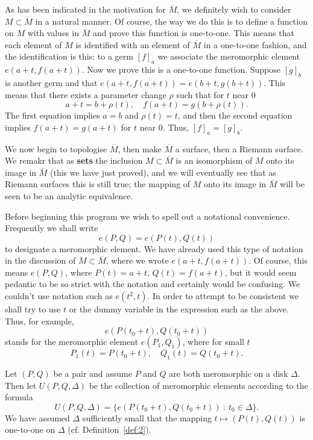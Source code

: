 \documentclass[a4paper,11pt]{article}
\begin{document}
As has been indicated in the motivation for $\overline{M}$, we
definitely wish to consider $M \subset \overline{M}$ in a natural
manner.  Of course, the way we do this is to define a function on $M$
with values in $\overline{M}$ and prove this function is one-to-one.
This means that each element of $M$ is identified with an element of
$\overline{M}$ in a one-to-one fashion, and the identification is
this: to a germ $[f]_a$ we associate the meromorphic element $e(a+t,
f(a+t))$.  Now we prove this is a one-to-one function.  Suppose
$[g]_b$ is another germ and that $e(a+t, f(a+t)) = e(b+t, g(b+t))$.
This means that there exists a parameter change $\rho$ such that
for $t$ near 0
$$
a + t = b + \rho(t),\quad
f(a+t) = g(b+\rho(t)).
$$
The first equation implies $a = b$ and $\rho(t) = t$, and then the
second equation implies $f(a+t) = g(a+t)$ for $t$ near 0.  Thus,
$[f]_a = [g]_b$.

We now begin to topologise $\overline{M}$, then make $\overline{M}$ a
surface, then a Riemann surface.  We remakr that as \textbf{sets} the
inclusion $M \subset \overline{M}$ is an isomorphism of $M$ onto its
image in $\overline{M}$ (this we have just proved), and we will
eventually see that as Riemann surfaces this is still true; the
mapping of $M$ onto its image in $\overline{M}$ will be seen to be an
analytic equivalence.

Before beginning this program we wish to spell out a notational
convenience.  Frequently we shall write
$$
e(P,Q) = e(P(t),Q(t))
$$
to designate a meromorphic element.  We have already used this type of
notation in the discussion of $M \subset \overline{M}$, where we wrote
$e(a + t, f(a+t))$.  Of course, this means $e(P,Q)$, where $P(t) =
a+t$, $Q(t) = f(a+t)$, but it would seem pedantic to be so strict
with the notation and certainly would be confusing.
We couldn't use notation such as $e(t^2,t)$.  In order to attempt to
be consistent we shall try to use $t$ or the dummy variable in the
expression such as the above.  Thus, for example,
$$
e(P(t_0 + t), Q(t_0 + t))
$$
stands for the meromorphic element $e(P_1,Q_1)$, where for small $t$
$$
P_1(t) = P(t_0 + t),\quad Q_1(t) = Q(t_0 + t).
$$

\begin{defn}
  \label{def:6}
  Let $(P,Q)$ be a pair and assume $P$ and $Q$ are both meromorphic on
  a disk $\Delta$.  Then let $U(P,Q,\Delta)$ be the collection of
  meromorphic elements according to the formula
  $$
  U(P,Q,\Delta) = \{e(P(t_0 + t), Q(t_0 + t)) ~:~ t_0 \in \Delta\}.
  $$
  We have assumed $\Delta$ sufficiently small that the mapping $t
  \mapsto (P(t), Q(t))$ is one-to-one on $\Delta$
  (cf. Definition~\ref{def:2}).
\end{defn}
\end{document}
